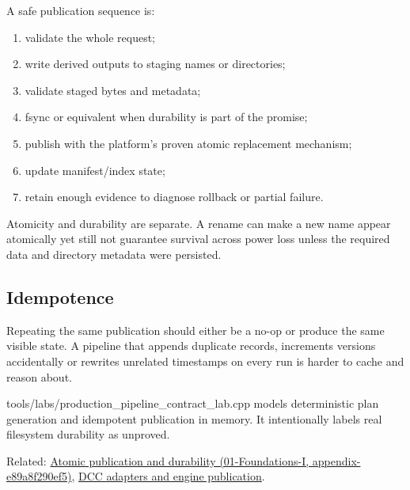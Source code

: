 A safe publication sequence is:

\begin{enumerate}
\def\labelenumi{\arabic{enumi}.}
\tightlist
\item
  validate the whole request;
\item
  write derived outputs to staging names or directories;
\item
  validate staged bytes and metadata;
\item
  fsync or equivalent when durability is part of the promise;
\item
  publish with the platform's proven atomic replacement mechanism;
\item
  update manifest/index state;
\item
  retain enough evidence to diagnose rollback or partial failure.
\end{enumerate}

Atomicity and durability are separate. A rename can make a new name appear atomically yet still not guarantee survival across power loss unless the required data and directory metadata were persisted.

\subsection{Idempotence}\label{appendix-91eaa3cbdbc3-idempotence}

Repeating the same publication should either be a no-op or produce the same visible state. A pipeline that appends duplicate records, increments versions accidentally or rewrites unrelated timestamps on every run is harder to cache and reason about.

tools/labs/production\_pipeline\_contract\_lab.cpp models deterministic plan generation and idempotent publication in memory. It intentionally labels real filesystem durability as unproved.

Related: \href{../01-Foundations-I/main.pdf\#nameddest=appendix-e89a8f290ef5}{Atomic publication and durability (01-Foundations-I, appendix-e89a8f290ef5)}, \hyperref[appendix-03ade9e1875f]{DCC adapters and engine publication}.
